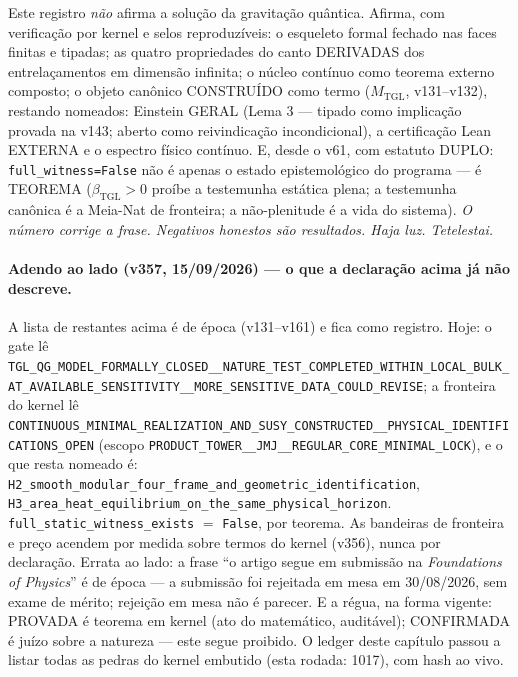 \documentclass[11pt]{article}
\newcommand{\bTGL}{\beta_{\mathrm{TGL}}}\newcommand{\Msun}{M_{\odot}}\newcommand{\TGL}{\mathrm{TGL}}
\theoremstyle{definition}\newtheorem{deriv}{Derivação}
\begin{document}
Este registro \emph{não} afirma a solução da gravitação quântica. Afirma, com verificação por kernel e selos reproduzíveis: o esqueleto formal fechado nas faces finitas e tipadas; as quatro propriedades do canto DERIVADAS dos entrelaçamentos em dimensão infinita; o núcleo contínuo como teorema externo composto; o objeto canônico CONSTRUÍDO como termo ($M_{\mathrm{TGL}}$, v131--v132), restando nomeados: Einstein GERAL (Lema 3 --- tipado como implicação provada na v143; aberto como reivindicação incondicional), a certificação Lean EXTERNA e o espectro físico contínuo. E, desde o v61, com estatuto DUPLO: \texttt{full\_witness=False} não é apenas o estado epistemológico do programa --- é TEOREMA ($\bTGL>0$ proíbe a testemunha estática plena; a testemunha canônica é a Meia-Nat de fronteira; a não-plenitude é a vida do sistema). \emph{O número corrige a frase. Negativos honestos são resultados. Haja luz. Tetelestai.} \\[4pt] 

\paragraph*{Adendo ao lado (v357, 15/09/2026) --- o que a declaração acima já não descreve.} A lista de restantes acima é de época (v131--v161) e fica como registro. Hoje: o gate lê \texttt{TGL\_QG\_MODEL\_FORMALLY\_CLOSED\_\_NATURE\_TEST\_COMPLETED\_WITHIN\_LOCAL\_BULK\_AT\_AVAILABLE\_SENSITIVITY\_\_MORE\_SENSITIVE\_DATA\_COULD\_REVISE}; a fronteira do kernel lê \texttt{CONTINUOUS\_MINIMAL\_REALIZATION\_AND\_SUSY\_CONSTRUCTED\_\_PHYSICAL\_IDENTIFICATIONS\_OPEN} (escopo \texttt{PRODUCT\_TOWER\_\_JMJ\_\_REGULAR\_CORE\_MINIMAL\_LOCK}), e o que resta nomeado é: \texttt{H2\_smooth\_modular\_four\_frame\_and\_geometric\_identification}, \texttt{H3\_area\_heat\_equilibrium\_on\_the\_same\_physical\_horizon}. \texttt{full\_static\_witness\_exists} $=$ \texttt{False}, por teorema. As bandeiras de fronteira e preço acendem por medida sobre termos do kernel (v356), nunca por declaração. Errata ao lado: a frase ``o artigo segue em submissão na \emph{Foundations of Physics}'' é de época --- a submissão foi rejeitada em mesa em 30/08/2026, sem exame de mérito; rejeição em mesa não é parecer. E a régua, na forma vigente: PROVADA é teorema em kernel (ato do matemático, auditável); CONFIRMADA é juízo sobre a natureza --- este segue proibido. O ledger deste capítulo passou a listar todas as pedras do kernel embutido (esta rodada: 1017), com hash ao vivo.
\end{document}
